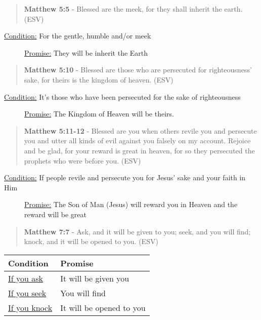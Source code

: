 \documentclass[11pt]{article}
\begin{document}
\begin{quote}
\textbf{Matthew 5:5} - Blessed are the meek, for they shall inherit the earth. (ESV)
\end{quote}

\begin{description}
\item[{\uline{Condition:} For the gentle, humble and/or meek}] \uline{Promise:} They will be inherit the Earth
\end{description}

\begin{quote}
\textbf{Matthew 5:10} - Blessed are those who are persecuted for righteousness' sake, for theirs is the kingdom of heaven. (ESV)
\end{quote}

\begin{description}
\item[{\uline{Condition:} It's those who have been persecuted for the sake of righteousness}] \uline{Promise:} The Kingdom of Heaven will be theirs.
\end{description}

\begin{quote}
\textbf{Matthew 5:11-12} - Blessed are you when others revile you and persecute you and utter all kinds of evil against you falsely on my account. Rejoice and be glad, for your reward is great in heaven, for so they persecuted the prophets who were before you. (ESV)
\end{quote}

\begin{description}
\item[{\uline{Condition:} If people revile and persecute you for Jesus' sake and your faith in Him}] \uline{Promise:} The Son of Man (Jesus) will reward you in Heaven and the reward will be great
\end{description}

\begin{quote}
\textbf{Matthew 7:7} - Ask, and it will be given to you; seek, and you will find; knock, and it will be opened to you. (ESV)
\end{quote}

\begin{center}
\begin{tabular}{ll}
Condition & Promise\\[0pt]
\hline
\uline{If you ask} & It will be given you\\[0pt]
\uline{If you seek} & You will find\\[0pt]
\uline{If you knock} & It will be opened to you\\[0pt]
\end{tabular}
\end{center}
\end{document}
